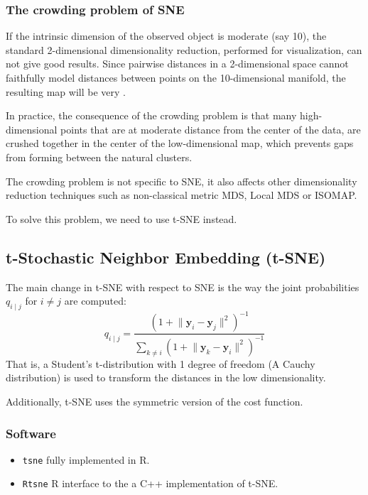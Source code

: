 \subsubsection{The crowding problem of SNE}
If the intrinsic dimension of the observed object is moderate (say 10),
the standard 2-dimensional dimensionality reduction, performed for
visualization, can not give good results. Since pairwise distances
in a 2-dimensional space cannot faithfully model distances between points
on the 10-dimensional manifold, the resulting map will be very .

\begin{marker}
	In practice, the consequence of the crowding problem is that many
	high-dimensional points that are at moderate distance from the
	center of the data, are crushed together in the center of the
	low-dimensional map, which prevents gaps from forming between the
	natural clusters.
\end{marker}

The crowding problem is not specific to SNE, it also affects other
dimensionality reduction techniques such as non-classical metric MDS,
Local MDS or ISOMAP.

To solve this problem, we need to use t-SNE instead.

\subsection{t-Stochastic Neighbor Embedding (t-SNE)}

The main change in t-SNE with respect to SNE is the way the joint
probabilities $q_{i \mid j}$ for $i \neq j$ are computed:
\begin{equation*}
	q_{i \mid j} = \frac
	{
		(1 + \lVert \boldsymbol y_i - \boldsymbol y_j \rVert^2)^{-1}
	}{
		\sum_{k \neq i} (1 + \lVert \boldsymbol y_k - \boldsymbol y_i \rVert^2)^{-1}
	}
\end{equation*}
That is, a Student's t-distribution with 1 degree of freedom (A Cauchy distribution)
is used to transform the distances in the low dimensionality.

Additionally, t-SNE uses the symmetric version of the cost function.

\subsubsection{Software}
\begin{itemize}
	\item \texttt{tsne} fully implemented in R.
	\item \texttt{Rtsne} R interface to the a C++ implementation of t-SNE.
\end{itemize}

